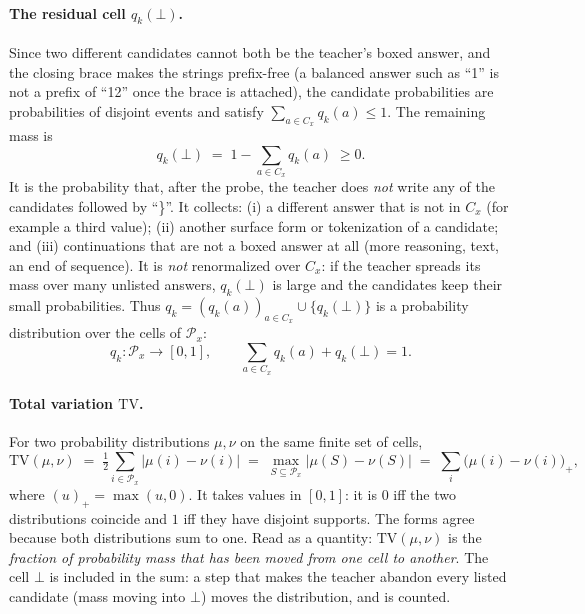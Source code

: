 \documentclass[11pt]{article}
\theoremstyle{definition}
\theoremstyle{remark}
\newcommand{\TV}{\mathrm{TV}}
\newcommand{\other}{\bot}
\begin{document}
\paragraph{The residual cell $q_k(\other)$.}
Since two different candidates cannot both be the teacher's boxed answer, and the closing brace makes the strings prefix-free (a balanced answer such as ``1'' is not a prefix of ``12'' once the brace is attached), the candidate probabilities are probabilities of disjoint events and satisfy $\sum_{a\in C_x}q_k(a)\le1$. The remaining mass is
\begin{equation}
q_k(\other)\;=\;1-\sum_{a\in C_x}q_k(a)\;\ge0 .
\label{eq:qbot}
\end{equation}
It is the probability that, after the probe, the teacher does \emph{not} write any of the candidates followed by ``\}''. It collects: (i) a different answer that is not in $C_x$ (for example a third value); (ii) another surface form or tokenization of a candidate; and (iii) continuations that are not a boxed answer at all (more reasoning, text, an end of sequence). It is \emph{not} renormalized over $C_x$: if the teacher spreads its mass over many unlisted answers, $q_k(\other)$ is large and the candidates keep their small probabilities. Thus $q_k=(q_k(a))_{a\in C_x}\cup\{q_k(\other)\}$ is a probability distribution over the cells of $\mathcal P_x$:
\begin{equation}
q_k:\mathcal P_x\to[0,1],\qquad \sum_{a\in C_x}q_k(a)+q_k(\other)=1 .
\label{eq:answerdist}
\end{equation}

\paragraph{Total variation $\TV$.}
For two probability distributions $\mu,\nu$ on the same finite set of cells,
\begin{equation}
\TV(\mu,\nu)\;=\;\tfrac12\sum_{i\in\mathcal P_x}\big|\mu(i)-\nu(i)\big|\;=\;\max_{S\subseteq\mathcal P_x}\big|\mu(S)-\nu(S)\big|\;=\;\sum_{i}\big(\mu(i)-\nu(i)\big)_+ ,
\label{eq:tv}
\end{equation}
where $(u)_+=\max(u,0)$. It takes values in $[0,1]$: it is $0$ iff the two distributions coincide and $1$ iff they have disjoint supports. The forms agree because both distributions sum to one. Read as a quantity: $\TV(\mu,\nu)$ is the \emph{fraction of probability mass that has been moved from one cell to another}. The cell $\other$ is included in the sum: a step that makes the teacher abandon every listed candidate (mass moving into $\other$) moves the distribution, and is counted.
\end{document}
